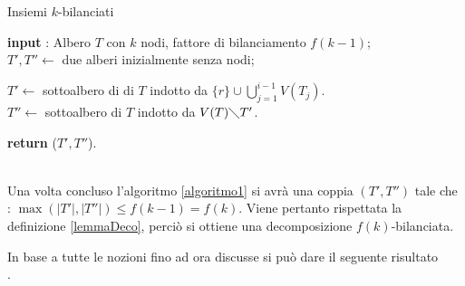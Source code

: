 \begin{algorithm}[H]
	\label{algoritmo1}
	\SetAlgoLined
	\caption{Insiemi $ k $-bilanciati}
	\textbf{input} : Albero $ T $ con $ k $ nodi, fattore di bilanciamento $ f(k-1) $;\\
	$ T' , T''\longleftarrow $ due alberi inizialmente senza nodi;\\ 	
	{
		{
			$ T'\longleftarrow $ sottoalbero di  di $ T $ indotto da $ \{r\} \cup \bigcup_{j=1}^{i-1}V(T_j)$.\\
			$ T''\longleftarrow $ sottoalbero di $ T $ indotto da $ V(T) \diagdown T'$.
		}
		 
}
	\textbf{return} ($ T',T'' $).

\end{algorithm}\mbox{}\\

Una volta concluso l'algoritmo \ref{algoritmo1} si avr\`a una coppia $ (T',T'') $ tale che : $ \max (|T'|,|T''|) \le f(k-1)=f(k) $. 
Viene pertanto rispettata la definizione \ref{lemmaDeco}, perci\`o si ottiene una decomposizione $ f(k) $-bilanciata.

In base a tutte le nozioni fino ad ora discusse si pu\`o dare il seguente risultato\mbox{}\\
.


